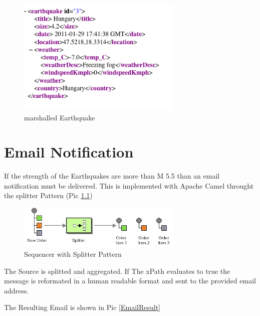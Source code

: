 \documentclass[11pt,english,ngerman, headsepline]{scrreprt}
\begin{document}
   
   \begin{figure}[h!]
	\begin{center}
	\includegraphics[width=0.7\textwidth]{pics/marshalledEarthquake}
	\end{center}
	\caption{marshalled Earthquake}
	\label{picmarshalledEarthquake.png} 
   \end{figure}



\chapter{Email Notification}

If the strength of the Earthquakes are more than M 5.5 than an email
notification must be delivered. This is implemented with Apache Camel throught
the splitter Pattern (Pic \ref{splitter}) 


 \begin{figure}[h!]
	\begin{center}
	\includegraphics[width=0.7\textwidth]{pics/Sequencer.jpg}
	\end{center}
	\caption{Sequencer with Splitter Pattern}
	\label{splitter} 
   \end{figure}


The Source is splitted and aggregated. If The xPath evaluates to true the
message is reformated in a human readable format and sent to the provided email
address.




The Resulting Email is shown in Pic \ref{EmailResult}
\end{document}
